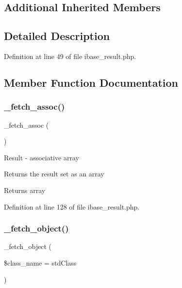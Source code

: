 \subsection*{Additional Inherited Members}


\subsection{Detailed Description}


Definition at line 49 of file ibase\+\_\+result.\+php.



\subsection{Member Function Documentation}
\mbox{\label{class_c_i___d_b__ibase__result_a43a9a92817f1334a1c10752ec44275a0}} 
\subsubsection{\texorpdfstring{\_fetch\_assoc()}{\_fetch\_assoc()}}
{\footnotesize\ttfamily \+\_\+fetch\+\_\+assoc (\begin{DoxyParamCaption}{ }\end{DoxyParamCaption})\hspace{0.3cm}{\ttfamily [protected]}}

Result -\/ associative array

Returns the result set as an array

\begin{DoxyReturn}{Returns}
array 
\end{DoxyReturn}


Definition at line 128 of file ibase\+\_\+result.\+php.

\mbox{\label{class_c_i___d_b__ibase__result_a60806be6a9c2488820813c2a7f4fef71}} 
\subsubsection{\texorpdfstring{\_fetch\_object()}{\_fetch\_object()}}
{\footnotesize\ttfamily \+\_\+fetch\+\_\+object (\begin{DoxyParamCaption}\item[{}]{\$class\+\_\+name = {\ttfamily \textquotesingle{}stdClass\textquotesingle{}} }\end{DoxyParamCaption})\hspace{0.3cm}{\ttfamily [protected]}}

